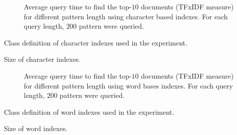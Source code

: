 \documentclass[9pt,a4paper]{scrartcl}
\begin{document}
\pagestyle{empty}

\begin{figure}

\caption{Average query time to find the top-$10$ documents (TFxIDF measure)
for different pattern length using character based indexes. For each query length, $200$ pattern were
queried.}
\end{figure}

\begin{table}
\centering

\caption{Class definition of character indexes used in the experiment.}
\end{table}

\begin{table}
\centering

\caption{Size of character indexes.}
\end{table}

\begin{figure}

\caption{Average query time to find the top-$10$ documents (TFxIDF measure)
for different pattern length using word bases indexes. For each query length, $200$ pattern were
queried.}
\end{figure}


\begin{table}
\centering

\caption{Class definition of word indexes used in the experiment.}
\end{table}

\begin{table}
\centering

\caption{Size of word indexes.}
\end{table}
\end{document}
